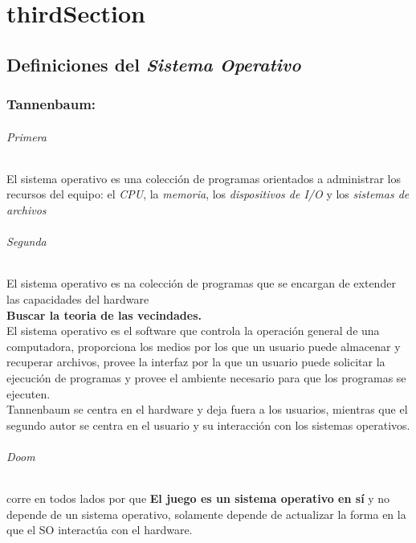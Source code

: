 \newpage
\part{\acrlong{thirdSection}}
\chapter{Definiciones del \textit{Sistema Operativo}}
\section{Tannenbaum:}
\paragraph{Primera} El sistema operativo es una colecci\'{o}n de programas orientados a administrar los recursos del equipo: el \textit{CPU}, la \textit{memoria}, los \textit{dispositivos de I/O} y los \textit{sistemas de archivos}\\

\paragraph{Segunda} El sistema operativo es na colecci\'{o}n de programas que se encargan de extender las capacidades del hardware\\

\textbf{Buscar la teoria de las vecindades.}\\

El sistema operativo es el software que controla la operaci\'{o}n general de una computadora, proporciona los medios por los que un usuario puede almacenar y recuperar archivos, provee la interfaz por la que un usuario puede solicitar la ejecuci\'{o}n de programas y provee el ambiente necesario para que los programas se ejecuten.\\

Tannenbaum se centra en el hardware y deja fuera a los usuarios, mientras que el segundo autor se centra en el usuario y su interacci\'{o}n con los sistemas operativos.\\

\paragraph{Doom} corre en todos lados por que \textbf{El juego es un sistema operativo en s\'{i}} y no depende de un sistema operativo, solamente depende de actualizar la forma en la que el SO interact\'{u}a con el hardware.\\

